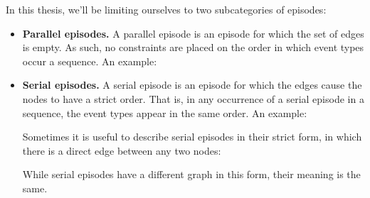 In this thesis, we'll be limiting ourselves to two subcategories of episodes:
\begin{itemize}
\item \textbf{Parallel episodes.} A parallel episode is an episode for which the set of edges is empty. As such, no constraints are placed on the order in which event types occur a sequence. An example:


\begin{center}
\end{center}

\item \textbf{Serial episodes.} A serial episode is an episode for which the edges cause the nodes to have a strict order. That is, in any occurrence of a serial episode in a sequence, the event types appear in the same order. An example:

\begin{center}
\end{center}

Sometimes it is useful to describe serial episodes in their strict form, in which there is a direct edge between any two nodes:

\begin{center}
\end{center}

While serial episodes have a different graph in this form, their meaning is the same.

\end{itemize}

